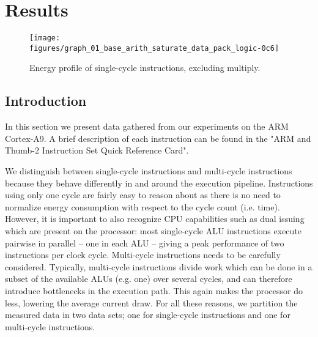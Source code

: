 \section{Results}

%
%
%
%

\begin{figure*}[ht]
    \centering
    \texttt{[image: figures/graph\_01\_base\_arith\_saturate\_data\_pack\_logic-0c6]}
    \caption{Energy profile of single-cycle instructions, excluding multiply.}
    \label{fig:singlecycle}
\end{figure*}



\subsection{Introduction}
In this section we present data gathered from our experiments on the ARM
Cortex-A9. A brief description of each instruction can be found in the "ARM and
Thumb-2 Instruction Set Quick Reference Card"\cite{armasmref}.

We distinguish between single-cycle instructions and multi-cycle instructions
because they behave differently in and around the execution pipeline.
Instructions using only one cycle are fairly easy to reason about as there is no
need to normalize energy consumption with respect to the cycle count (i.e.
time). However, it is important to also recognize CPU capabilities such as dual
issuing which are present on the processor: most single-cycle ALU instructions
execute pairwise in parallel -- one in each ALU -- giving a peak performance of
two instructions per clock cycle. Multi-cycle instructions needs to be carefully
considered. Typically, multi-cycle instructions divide work which can be done in
a subset of the available ALUs (e.g. one) over several cycles, and can therefore
introduce bottlenecks in the execution path. This again makes the processor do
less, lowering the average current draw. For all these reasons, we partition the
measured data in two data sets; one for single-cycle instructions and one for
multi-cycle instructions.

